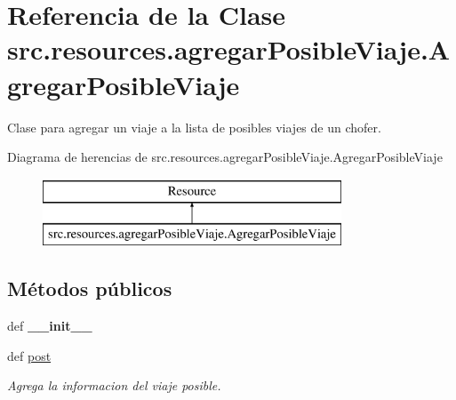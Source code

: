 \hypertarget{classsrc_1_1resources_1_1agregar_posible_viaje_1_1_agregar_posible_viaje}{\section{Referencia de la Clase src.\-resources.\-agregar\-Posible\-Viaje.\-Agregar\-Posible\-Viaje}
\label{classsrc_1_1resources_1_1agregar_posible_viaje_1_1_agregar_posible_viaje}
}


Clase para agregar un viaje a la lista de posibles viajes de un chofer.  


Diagrama de herencias de src.\-resources.\-agregar\-Posible\-Viaje.\-Agregar\-Posible\-Viaje\begin{figure}[H]
\begin{center}
\leavevmode
\includegraphics[height=2.000000cm]{classsrc_1_1resources_1_1agregar_posible_viaje_1_1_agregar_posible_viaje}
\end{center}
\end{figure}
\subsection*{Métodos públicos}
\begin{DoxyCompactItemize}
\item 
\hypertarget{classsrc_1_1resources_1_1agregar_posible_viaje_1_1_agregar_posible_viaje_a0eb8e6dc028544d8ab763ad50e18b734}{def {\bfseries \-\_\-\-\_\-init\-\_\-\-\_\-}}\label{classsrc_1_1resources_1_1agregar_posible_viaje_1_1_agregar_posible_viaje_a0eb8e6dc028544d8ab763ad50e18b734}

\item 
def \hyperlink{classsrc_1_1resources_1_1agregar_posible_viaje_1_1_agregar_posible_viaje_a6842769a8d9d3ba65137ea0b9bd0d21c}{post}
\begin{DoxyCompactList}\small\item\em Agrega la informacion del viaje posible. \end{DoxyCompactList}\end{DoxyCompactItemize}
